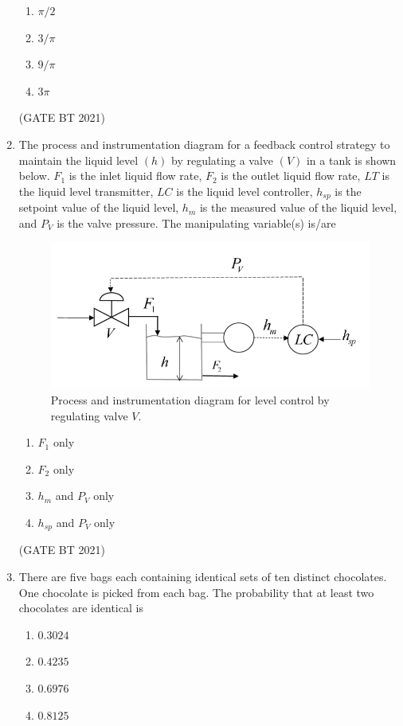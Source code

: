 \documentclass[journal,12pt,onecolumn]{IEEEtran}
\theoremstyle{remark}
\begin{document}
\begin{enumerate}
\begin{enumerate}
\item $\pi/2$
\item $3/\pi$
\item $9/\pi$
\item $3\pi$
\end{enumerate}

\hfill (GATE BT 2021)
\item The process and instrumentation diagram for a feedback control strategy to maintain the liquid level $(h)$ by regulating a valve $(V)$ in a tank is shown below. $F_1$ is the inlet liquid flow rate, $F_2$ is the outlet liquid flow rate, $LT$ is the liquid level transmitter, $LC$ is the liquid level controller, $h_{sp}$ is the setpoint value of the liquid level, $h_m$ is the measured value of the liquid level, and $P_V$ is the valve pressure. The manipulating variable(s) is/are
\begin{figure}[h]
    \centering
    \includegraphics[width=\columnwidth]{figs/control.png}
    \caption{Process and instrumentation diagram for level control by regulating valve $V$.}
\end{figure}
\begin{enumerate}
    \item $F_1$ only
    \item $F_2$ only
    \item $h_m$ and $P_V$ only
    \item $h_{sp}$ and $P_V$ only
\end{enumerate}
\hfill (GATE BT 2021)


\item There are five bags each containing identical sets of ten distinct chocolates. One chocolate is picked from each bag. The probability that at least two chocolates are identical is

\begin{enumerate}
\item $0.3024$
\item $0.4235$
\item $0.6976$
\item $0.8125$
\end{enumerate}


\end{enumerate}
\end{document}
